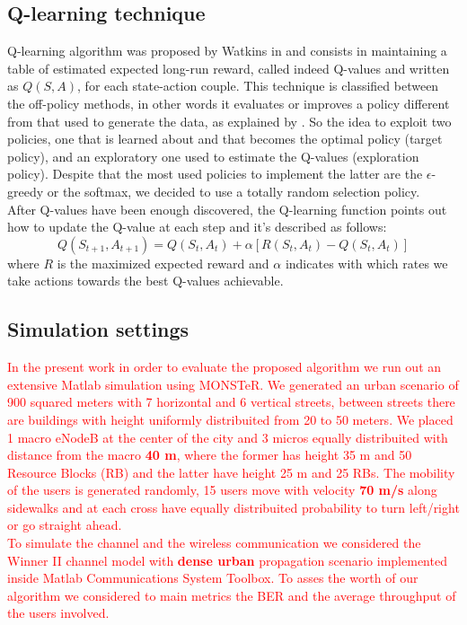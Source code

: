 \documentclass[conference,10pt]{IEEEtran}
\begin{document}
\subsection{Q-learning technique}
Q-learning algorithm was proposed by Watkins in \cite{watkins1992q} and consists in maintaining a table of estimated expected long-run reward, called indeed Q-values and written as $Q(S,A)  $, for each state-action couple. This technique is classified between the off-policy methods, in other words it evaluates or improves a policy different from that used to generate the data, as explained by \cite{sutton1998reinforcement}. So the idea to exploit two policies, one that is learned about and that becomes the optimal policy (target policy), and an exploratory one used to estimate the Q-values (exploration policy). Despite that the most used policies to implement the latter are the $\epsilon$-greedy or the softmax, we decided to use a totally random selection policy. \\
After Q-values have been enough discovered, the Q-learning function points out how to update the Q-value at each step and it's described as follows:
\begin{equation*}
Q(S_{t+1},A_{t+1})=Q(S_{t},A_{t})+\alpha[R(S_{t},A_{t})-Q(S_{t},A_{t})]
\end{equation*}
where $ R  $ is the maximized expected reward and $\alpha$ indicates with which rates we take actions towards the best Q-values achievable.
\subsection{Simulation settings}
\textcolor{red}{In the present work in order to evaluate the proposed algorithm we run out an extensive Matlab simulation using MONSTeR. We generated an urban scenario of 900 squared meters with 7 horizontal and 6 vertical streets, between streets there are buildings with height uniformly distribuited from 20 to 50 meters. We placed 1 macro eNodeB at the center of the city and 3 micros equally distribuited with distance from the macro \textbf{40 m}, where the former has height 35 m and 50 Resource Blocks (RB) and the latter have height 25 m and 25 RBs. The mobility of the users is generated randomly, 15 users move with velocity \textbf{70 m/s} along sidewalks and at each cross have equally distribuited probability to turn left/right or go straight ahead.\\
To simulate the channel and the wireless communication we considered the Winner II channel model with \textbf{dense urban} propagation scenario implemented inside Matlab Communications System Toolbox.
To asses the worth of our algorithm we considered to main metrics the BER and the average throughput of the users involved.
}
\end{document}
